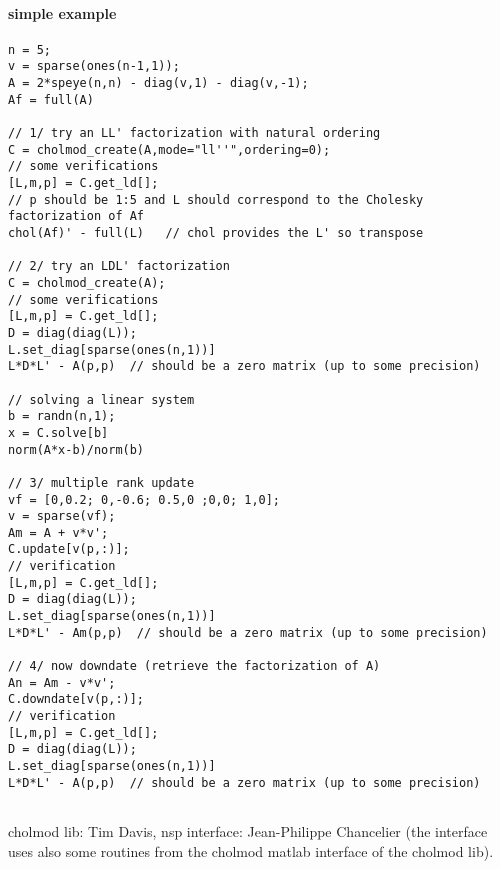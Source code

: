 \begin{examples}
 \paragraph{simple example}
  \begin{Verbatim}
n = 5;
v = sparse(ones(n-1,1));
A = 2*speye(n,n) - diag(v,1) - diag(v,-1);
Af = full(A)

// 1/ try an LL' factorization with natural ordering
C = cholmod_create(A,mode="ll''",ordering=0);
// some verifications
[L,m,p] = C.get_ld[];
// p should be 1:5 and L should correspond to the Cholesky factorization of Af
chol(Af)' - full(L)   // chol provides the L' so transpose

// 2/ try an LDL' factorization
C = cholmod_create(A);
// some verifications
[L,m,p] = C.get_ld[];
D = diag(diag(L));
L.set_diag[sparse(ones(n,1))]
L*D*L' - A(p,p)  // should be a zero matrix (up to some precision)

// solving a linear system
b = randn(n,1);
x = C.solve[b]
norm(A*x-b)/norm(b)

// 3/ multiple rank update
vf = [0,0.2; 0,-0.6; 0.5,0 ;0,0; 1,0];
v = sparse(vf);
Am = A + v*v';
C.update[v(p,:)];
// verification
[L,m,p] = C.get_ld[];
D = diag(diag(L));
L.set_diag[sparse(ones(n,1))]
L*D*L' - Am(p,p)  // should be a zero matrix (up to some precision)

// 4/ now downdate (retrieve the factorization of A)
An = Am - v*v';
C.downdate[v(p,:)];
// verification
[L,m,p] = C.get_ld[];
D = diag(diag(L));
L.set_diag[sparse(ones(n,1))]
L*D*L' - A(p,p)  // should be a zero matrix (up to some precision)


  \end{Verbatim}
 \end{examples}

\begin{authors}
   cholmod lib: Tim Davis, nsp interface: Jean-Philippe Chancelier (the interface uses also
   some routines from the cholmod matlab interface of the cholmod lib).
\end{authors}
